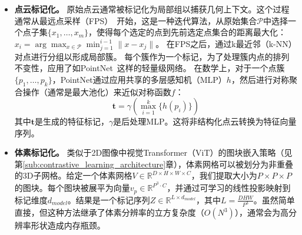 \documentclass[../../book-main_zh.tex]{subfiles}
\begin{document}
\begin{itemize}
\item \textbf{点云标记化。} 
原始点云通常被标记化为局部组以捕获几何上下文。这个过程通常从最远点采样（FPS）~\cite{eldar1997farthest}开始，这是一种迭代算法，从原始集合$\mathcal{P}$中选择一个点子集$\{x_1, \dots, x_m\}$，使得每个选定的点到先前选定点集合的距离最大化：
$x_{i} = \arg\max_{x \in \mathcal{P}} \min_{j=1}^{i-1} \|x - x_j\|$。
在FPS之后，通过k最近邻（k-NN）对点进行分组以形成局部簇。
每个簇作为一个标记，为了处理簇内点的排列不变性，应用了如PointNet~\cite{qi2017pointnet}这样的轻量级网络。
在数学上，对于一个点簇$\{p_1, \dots, p_k\}$，PointNet通过应用共享的多层感知机（MLP）$h$，然后进行对称聚合操作（通常是最大池化）来近似对称函数$f$：
\begin{equation}
    \boldsymbol{t} = \gamma \left( \max_{i=1}^k \{ h(p_i) \} \right)
\end{equation}
其中$\boldsymbol{t}$是生成的特征标记，$\gamma$是后处理MLP。这将非结构化点云转换为特征向量序列。



    
    
\item \textbf{体素标记化。} 
类似于2D图像中视觉Transformer（ViT）的图块嵌入策略（见第\ref{sub:contrastive_learning_architecture}章），体素网格可以被划分为非重叠的3D子网格。给定一个体素网格$V \in \mathbb{R}^{D \times H \times W \times C}$，我们提取大小为$P \times P \times P$的图块。每个图块被展平为向量$v_p \in \mathbb{R}^{P^3 \cdot C}$，并通过可学习的线性投影映射到标记维度$d_{model}$。结果是一个标记序列$Z \in \mathbb{R}^{L \times d_{model}}$，其中$L = \frac{DHW}{P^3}$。虽然简单直接，但这种方法继承了体素分辨率的立方复杂度（$O(N^3)$），通常会为高分辨率形状造成内存瓶颈。


    

\end{itemize}
\end{document}

